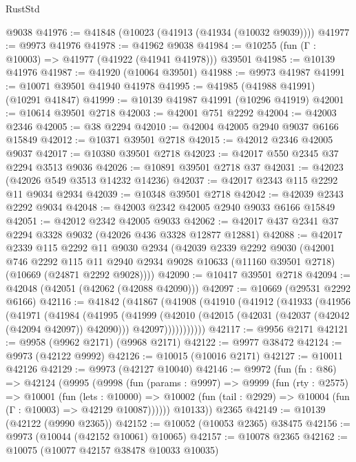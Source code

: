 \begin{lexlean}{RustStd}
\begin{coremodule}
    @9038
@41976 := @41848 (@10023 (@41913 (@41934 (@10032 @9039))))
@41977 := @9973 @41976
@41978 := @41962 @9038
@41984 := @10255 (fun (Γ : @10003) => @41977 (@41922 (@41941 @41978))) @39501
@41985 := @10139 @41976
@41987 := @41920 (@10064 @39501)
@41988 := @9973 @41987
@41991 := @10071 @39501 @41940 @41978
@41995 := @41985 (@41988 @41991) (@10291 @41847)
@41999 := @10139 @41987 @41991 (@10296 @41919)
@42001 := @10614 @39501 @2718
@42003 := @42001 @751 @2292
@42004 := @42003 @2346
@42005 := @38 @2294
@42010 := @42004 @42005 @2940 @9037 @6166 @15849
@42012 := @10371 @39501 @2718
@42015 := @42012 @2346 @42005 @9037
@42017 := @10380 @39501 @2718
@42023 := @42017 @550 @2345 @37 @2294 @3513 @9036
@42026 := @10891 @39501 @2718 @37
@42031 := @42023 (@42026 @549 @3513 @14232 @14236)
@42037 := @42017 @2343 @115 @2292 @11 @9034 @2934
@42039 := @10348 @39501 @2718
@42042 := @42039 @2343 @2292 @9034
@42048 := @42003 @2342 @42005 @2940 @9033 @6166 @15849
@42051 := @42012 @2342 @42005 @9033
@42062 := @42017 @437 @2341 @37 @2294 @3328 @9032 (@42026 @436 @3328 @12877 @12881)
@42088 := @42017
    @2339
    @115
    @2292
    @11
    @9030
    @2934
    (@42039
      @2339
      @2292
      @9030
      (@42001
        @746
        @2292
        @115
        @11
        @2940
        @2934
        @9028
        @10633
        (@11160 @39501 @2718)
        (@10669 (@24871 @2292 @9028))))
@42090 := @10417 @39501 @2718
@42094 := @42048 (@42051 (@42062 (@42088 @42090)))
@42097 := @10669 (@29531 @2292 @6166)
@42116 := @41842
    (@41867
      (@41908
        (@41910
          (@41912
            (@41933
              (@41956
                (@41971
                  (@41984
                    (@41995
                      (@41999
                        (@42010
                          (@42015 (@42031 (@42037 (@42042 (@42094 @42097)) @42090)))
                          @42097)))))))))))
@42117 := @9956 @2171
@42121 := @9958 (@9962 @2171) (@9968 @2171)
@42122 := @9977 @38472
@42124 := @9973 (@42122 @9992)
@42126 := @10015 (@10016 @2171)
@42127 := @10011 @42126
@42129 := @9973 (@42127 @10040)
@42146 := @9972
    (fun (fn : @86) =>
    @42124
      (@9995
        (@9998
          (fun (params : @9997) =>
          @9999
            (fun (rty : @2575) =>
            @10001
              (fun (lets : @10000) =>
              @10002 (fun (tail : @2929) => @10004 (fun (Γ : @10003) => @42129 @10087))))))
        @10133))
    @2365
@42149 := @10139 (@42122 (@9990 @2365))
@42152 := @10052 (@10053 @2365) @38475
@42156 := @9973 (@10044 (@42152 @10061) @10065)
@42157 := @10078 @2365
@42162 := @10075 (@10077 @42157 @38478 @10033 @10035)

\end{coremodule}
\end{lexlean}
